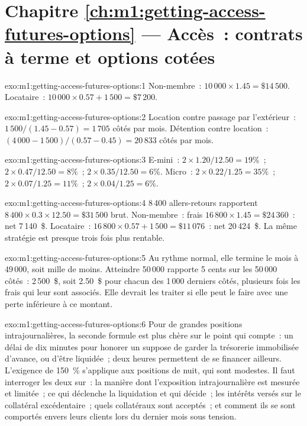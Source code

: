 \section*{Chapitre \ref{ch:m1:getting-access-futures-options} --- Accès~: contrats à terme et options cotées}

\begin{solution}{exo:m1:getting-access-futures-options:1}
Non-membre~: $10\,000 \times 1.45 = \$14\,500$. Locataire~: $10\,000 \times 0.57 + 1\,500
= \$7\,200$.
\end{solution}

\begin{solution}{exo:m1:getting-access-futures-options:2}
Location contre passage par l'extérieur~: $1\,500/(1.45 - 0.57) = 1\,705$ côtés par mois. Détention
contre location~: $(4\,000 - 1\,500)/(0.57 - 0.45) = 20\,833$ côtés par mois.
\end{solution}

\begin{solution}{exo:m1:getting-access-futures-options:3}
E-mini~: $2 \times 1.20/12.50 = 19\%$~; $2 \times 0.47/12.50 = 8\%$~; $2 \times
0.35/12.50 = 6\%$. Micro~: $2 \times 0.22/1.25 = 35\%$~; $2 \times 0.07/1.25 = 11\%$~;
$2 \times 0.04/1.25 = 6\%$.
\end{solution}

\begin{solution}{exo:m1:getting-access-futures-options:4}
8\,400 allers-retours rapportent $8\,400 \times 0.3 \times 12.50 = \$31\,500$ brut.
Non-membre~: frais $16\,800 \times 1.45 = \$24\,360$~: net 7\,140~\$. Locataire~: $16\,800
\times 0.57 + 1\,500 = \$11\,076$~: net 20\,424~\$. La même stratégie est presque
trois fois plus rentable.
\end{solution}

\begin{solution}{exo:m1:getting-access-futures-options:5}
Au rythme normal, elle termine le mois à 49\,000, soit mille de moins. Atteindre
50\,000 rapporte 5 cents sur les 50\,000 côtés~: 2\,500~\$, soit 2.50~\$ pour chacun des
1\,000 derniers côtés, plusieurs fois les frais qui leur sont associés. Elle devrait les traiter si elle
peut le faire avec une perte inférieure à ce montant.
\end{solution}

\begin{solution}{exo:m1:getting-access-futures-options:6}
Pour de grandes positions intrajournalières, la seconde formule est plus chère sur le point qui compte~:
un délai de dix minutes pour honorer un  suppose de garder la trésorerie immobilisée d'avance, ou d'être
liquidée~; deux heures permettent de se financer ailleurs. L'exigence de 150~\% s'applique
aux positions de nuit, qui sont modestes. Il faut interroger les deux sur~: la manière dont l'exposition intrajournalière est
mesurée et limitée~; ce qui déclenche la liquidation et qui décide~; les intérêts
versés sur le collatéral excédentaire~; quels collatéraux sont acceptés~; et comment ils
se sont comportés envers leurs clients lors du dernier mois sous tension.
\end{solution}

